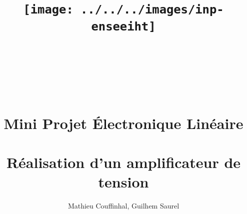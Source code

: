 \documentclass[11pt;a4paper]{report}
\title{\texttt{[image: ../../../images/inp-enseeiht]} \\ ~ \\ ~ \\ ~ \\ ~ \\ Mini Projet Électronique Linéaire \\ ~ \\ \large{Réalisation d'un amplificateur de tension}}
\author{Mathieu Couffinhal, Guilhem Saurel}
\date{\oldstylenums{\today}}
\begin{document}
 \begin{titlepage}
  \maketitle
 \end{titlepage}


 \tableofcontents
 
 
 
 
 
 
\end{document}
